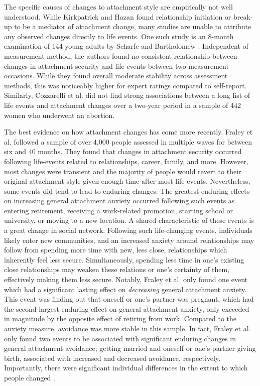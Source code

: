 \documentclass[12pt]{report}
\begin{document}
The specific causes of changes to attachment style are empirically not well understood.
While Kirkpatrick and Hazan \citeyear{Kirkpatrick1994} found relationship initiation or break-up to be a mediator of attachment change, many studies are unable to attribute any observed changes directly to life events.
One such study is an 8-month examination of 144 young adults by Scharfe and Bartholomew \citeyear{Scharfe1994}.
Independent of measurement method, the authors found no consistent relationship between changes in attachment security and life events between two measurement occasions.
While they found overall moderate stability across assessment methods, this was noticeably higher for expert ratings compared to self-report.
Similarly, Cozzarelli et al. \citeyear{Cozzarelli2003} did not find strong associations between a long list of life events and attachment changes over a two-year period in a sample of 442 women who underwent an abortion.

The best evidence on how attachment changes has come more recently.
Fraley et al. \citeyear{Fraley2021} followed a sample of over 4,000 people assessed in multiple waves for between six and 40 months.
They found that changes in attachment security occurred following life-events related to relationships, career, family, and more. However, most changes were transient and the majority of people would revert to their original attachment style given enough time after most life events.
Nevertheless, some events did tend to lead to enduring changes.
The greatest enduring effects on increasing general attachment anxiety occurred following such events as entering retirement, receiving a work-related promotion, starting school or university, or moving to a new location. A shared characteristic of these events is a great change in social network.
Following such life-changing events, individuals likely enter new communities, and an increased anxiety around relationships may follow from spending more time with new, less close, relationships which inherently feel less secure.
Simultaneously, spending less time in one's existing close relationships may weaken these relations or one's certainty of them, effectively making them less secure.
Notably, Fraley et al. \citeyear{Fraley2021} only found one event which had a significant lasting effect on \textit{decreasing} general attachment anxiety.
This event was finding out that oneself or one's partner was pregnant, which had the second-largest enduring effect on general attachment anxiety, only exceeded in magnitude by the opposite effect of retiring from work.
Compared to the anxiety measure, avoidance was more stable in this sample.
In fact, Fraley et al. only found two events to be associated with significant enduring changes in general attachment avoidance; getting married and oneself or one's partner giving birth, associated with increased and decreased avoidance, respectively.
Importantly, there were significant individual differences in the extent to which people changed \cite{Fraley2021}.
\end{document}
